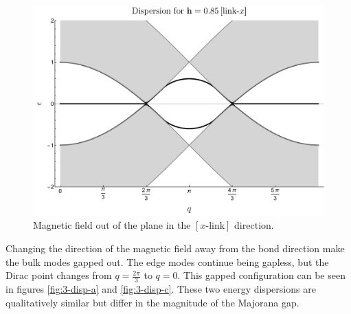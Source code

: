 \begin{figure}[t]
    \centering
    \includegraphics[width = 0.6 \textwidth]{images/CH3/disp_x.pdf}
    \caption{Magnetic field out of the plane in the $[x\text{-link}]$ direction.  }
    \label{fig:3-disp-x}
\end{figure}

Changing the direction of the magnetic field away from the bond direction make the bulk modes gapped out. The edge modes continue being gapless, but the Dirac point changes from $q=\frac{2 \pi}{3}$ to $q=0$. This gapped configuration can be seen in figures \ref{fig:3-disp-a} and \ref{fig:3-disp-c}. These two energy dispersions are qualitatively similar but differ in the magnitude of the Majorana gap.

